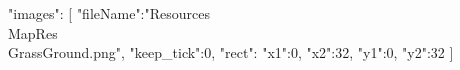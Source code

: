 {
	"images":
	[
		{
			"fileName":"Resources\\MapRes\\GrassGround.png",
			"keep_tick":0,
			"rect":
			{
				"x1":0,
				"x2":32,
				"y1":0,
				"y2":32
			}
		}
	]
}
